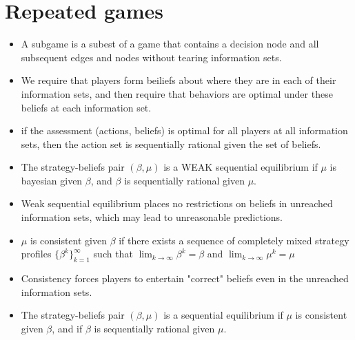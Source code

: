 \documentclass[11pt]{article} %
\begin{document}
\section{Repeated games}
\begin{itemize}
\item A subgame is a subest of a game that contains a decision node and all subsequent edges and nodes without tearing information sets. 
\item We require that players form beiliefs about where they are in each of their information sets, and then require that behaviors are optimal under these beliefs at each information set.
\item if the assessment (actions, beliefs) is optimal for all players at all information sets, then the action set is sequentially rational given the set of beliefs.
\item The strategy-beliefs pair $(\beta,\mu)$ is a WEAK sequential equilibrium if $\mu$ is bayesian given $\beta$, and $\beta$ is sequentially rational given $\mu$.
\item Weak sequential equilibrium places no restrictions on beliefs in unreached information sets, which may lead to unreasonable predictions.
\item $\mu$ is consistent given $\beta$ if there exists a sequence of completely mixed strategy profiles $\{ \beta^k\}_{k=1}^{\infty}$ such that $\lim_{k\rightarrow \infty} \beta^k = \beta$ and $\lim_{k\rightarrow \infty} \mu^k = \mu$
\item Consistency forces players to entertain "correct" beliefs even in the unreached information sets.
\item The strategy-beliefs pair $(\beta,\mu)$ is a sequential equilibrium if $\mu$ is consistent given $\beta$, and if $\beta$ is sequentially rational given $\mu$.
\end{itemize}
\end{document}
